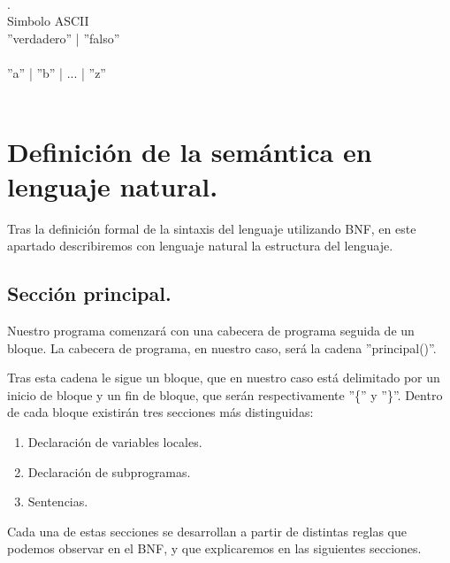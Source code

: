 \documentclass[12pt, spanish]{article}
\begin{document}
\begin{bnf*}
    \bnfmore{| \bnfsp \epsilon}\\
    { }\\
    \\
		{.}\\
        {Simbolo ASCII}\\
		{ ''verdadero'' | ''falso'' }\\
		{}\\
		{''a'' \bnfsp | \bnfsp ''b'' \bnfsp | \bnfsp ... \bnfsp | \bnfsp ''z''}\\
		\\
\end{bnf*}


\section{Definición de la semántica en lenguaje natural.}

Tras la definición formal de la sintaxis del lenguaje utilizando BNF, en este apartado describiremos con lenguaje natural la estructura del lenguaje.


\subsection{Sección principal.}

Nuestro programa comenzará con una cabecera de programa seguida de un bloque. La cabecera de programa, en nuestro caso, será la cadena ''principal()''.

Tras esta cadena le sigue un bloque, que en nuestro caso está delimitado por un inicio de bloque y un fin de bloque, que serán respectivamente ''\{'' y ''\}''. Dentro de cada bloque existirán tres secciones más distinguidas:

\begin{enumerate}
	\item Declaración de variables locales.
	\item Declaración de subprogramas.
	\item Sentencias.
\end{enumerate}

Cada una de estas secciones se desarrollan a partir de distintas reglas que podemos observar en el BNF, y que explicaremos en las siguientes secciones.
\end{document}
